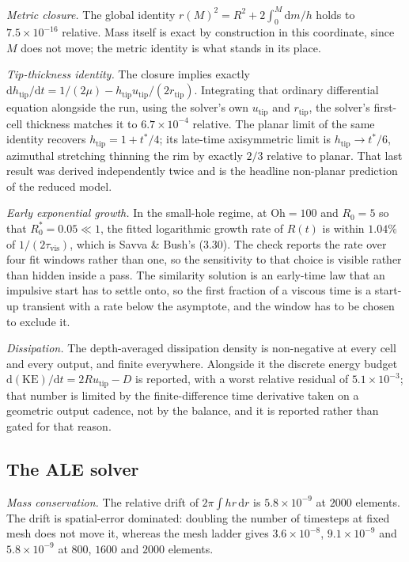 \documentclass[11pt,a4paper]{article}
\newcommand{\Oh}{\mathrm{Oh}}
\begin{document}
\emph{Metric closure.} The global identity
$r(M)^{2} = R^{2} + 2\int_{0}^{M}\mathrm{d}m/h$ holds to
$7.5\times10^{-16}$ relative. Mass itself is exact by construction in this
coordinate, since $M$ does not move; the metric identity is what stands in its
place.

\emph{Tip-thickness identity.} The closure implies exactly
$\mathrm{d}h_{\mathrm{tip}}/\mathrm{d}t = 1/(2\mu) -
h_{\mathrm{tip}}u_{\mathrm{tip}}/(2r_{\mathrm{tip}})$. Integrating that ordinary
differential equation alongside the run, using the solver's own
$u_{\mathrm{tip}}$ and $r_{\mathrm{tip}}$, the solver's first-cell thickness
matches it to $6.7\times10^{-4}$ relative. The planar limit of the same identity
recovers $h_{\mathrm{tip}} = 1 + t^{*}/4$; its late-time axisymmetric limit is
$h_{\mathrm{tip}}\to t^{*}/6$, azimuthal stretching thinning the rim by exactly
$2/3$ relative to planar. That last result was derived independently twice and
is the headline non-planar prediction of the reduced model.

\emph{Early exponential growth.} In the small-hole regime, at $\Oh = 100$ and
$R_{0}=5$ so that $R_{0}^{*}=0.05\ll1$, the fitted logarithmic growth rate of
$R(t)$ is within $1.04\%$ of $1/(2\tau_{\mathrm{vis}})$, which is Savva \&
Bush's (3.30). The check reports the rate over four fit windows rather than one,
so the sensitivity to that choice is visible rather than hidden inside a pass.
The similarity solution is an early-time law that an impulsive start has to
settle onto, so the first fraction of a viscous time is a start-up transient
with a rate below the asymptote, and the window has to be chosen to exclude it.

\emph{Dissipation.} The depth-averaged dissipation density is non-negative at
every cell and every output, and finite everywhere. Alongside it the discrete
energy budget $\mathrm{d}(\mathrm{KE})/\mathrm{d}t = 2Ru_{\mathrm{tip}} - D$ is
reported, with a worst relative residual of $5.1\times10^{-3}$; that number is
limited by the finite-difference time derivative taken on a geometric output
cadence, not by the balance, and it is reported rather than gated for that
reason.

\subsection{The ALE solver}
\label{sec:verif-ale}

\emph{Mass conservation.} The relative drift of $2\pi\int h r\,\mathrm{d}r$ is
$5.8\times10^{-9}$ at $2000$ elements. The drift is spatial-error dominated:
doubling the number of timesteps at fixed mesh does not move it, whereas the
mesh ladder gives $3.6\times10^{-8}$, $9.1\times10^{-9}$ and
$5.8\times10^{-9}$ at $800$, $1600$ and $2000$ elements.
\end{document}
